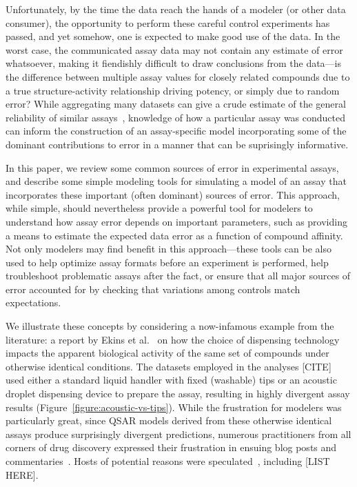 \documentclass[aps,pre,twocolumn,nofootinbib,superscriptaddress,linenumbers]{revtex4-1}
\begin{document}
Unfortunately, by the time the data reach the hands of a modeler (or other data consumer), the opportunity to perform these careful control experiments has passed, and yet somehow, one is expected to make good use of the data.
In the worst case, the communicated assay data may not contain any estimate of error whatsoever, making it fiendishly difficult to draw conclusions from the data---is the difference between multiple assay values for closely related compounds due to a true structure-activity relationship driving potency, or simply due to random error?
While aggregating many datasets can give a crude estimate of the general reliability of similar assays~\cite{kramer_experimental_2012,kalliokoski_comparability_2013}, knowledge of how a particular assay was conducted can inform the construction of an assay-specific model incorporating some of the dominant contributions to error in a manner that can be suprisingly informative.



In this paper, we review some common sources of error in experimental assays, and describe some simple modeling tools for simulating a model of an assay that incorporates these important (often dominant) sources of error. 
This approach, while simple, should nevertheless provide a powerful tool for modelers to understand how assay error depends on important parameters, such as providing a means to estimate the expected data error as a function of compound affinity.
Not only modelers may find benefit in this approach---these tools can be also used to help optimize assay formats before an experiment is performed, help troubleshoot problematic assays after the fact, or ensure that all major sources of error accounted for by checking that variations among controls match expectations.

We illustrate these concepts by considering a now-infamous example from the literature: a report by Ekins et al.~\cite{ekins_dispensing_2013} on how the choice of dispensing technology impacts the apparent biological activity of the same set of compounds under otherwise identical conditions.
The datasets employed in the analyses [CITE] used either a standard liquid handler with fixed (washable) tips or an acoustic droplet dispensing device to prepare the assay, resulting in highly divergent assay results (Figure~\ref{figure:acoustic-vs-tips}).
While the frustration for modelers was particularly great, since QSAR models derived from these otherwise identical assays produce surprisingly divergent predictions, numerous practitioners from all corners of drug discovery expressed their frustration in ensuing blog posts and commentaries~\cite{in-the-pipeline-comments}.
Hosts of potential reasons were speculated~\cite{in-the-pipeline-comments}, including [LIST HERE].
\end{document}
